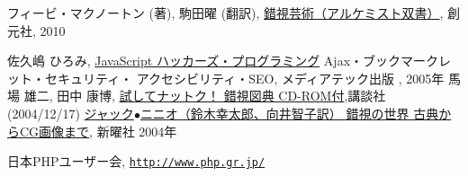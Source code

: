\begin{thebibliography}{99}
 フィービ・マクノートン (著), 駒田曜 (翻訳),
				 \href{http://www.amazon.co.jp/%E9%8C%AF%E8%A6%96%E8%8A%B8%E8%A1%93%EF%BC%88%E3%82%A2%E3%83%AB%E3%82%B1%E3%83%9F%E3%82%B9%E3%83%88%E5%8F%8C%E6%9B%B8%EF%BC%89-%E3%83%95%E3%82%A3%E3%83%BC%E3%83%93%E3%83%BB%E3%83%9E%E3%82%AF%E3%83%8E%E3%83%BC%E3%83%88%E3%83%B3/dp/4422214802/ref=sr_1_42?s=books&ie=UTF8&qid=1457336858&sr=1-42&keywords=%E9%8C%AF%E8%A6%96}{錯視芸術（アルケミスト双書）},
				 創元社, 2010
\fi
\iffalse
 \bibitem{Ajax}深津 貴之、増井 雄一郎、川崎 有亮、台場 圭一、WINGSプロジェクト,\\
\href{http://www.amazon.co.jp/exec/obidos/ASIN/4774125792/qid=1149342810/sr=8-2/ref=sr_8_xs_ap_i2_xgl14/249-2928731-2660351}
{Ajax 実装のための基礎テクニック}、技術評論社、2006年
\fi
\ifSeminor
\else
 佐久嶋 ひろみ,
\href{http://www.amazon.co.jp/exec/obidos/search-handle-url/index=books-jp&field-keywords=javascript/ref=xs_ap_sai1_xgl14/249-2928731-2660351}{JavaScript
	ハッカーズ・プログラミング} Ajax・ブックマークレット・セキュリティ・
	アクセシビリティ・SEO, メディアテック出版 , 2005年
         \fi
馬場 雄二, 田中 康博,
\href{http://www.amazon.co.jp/%E8%A9%A6%E3%81%97%E3%81%A6%E3%83%8A%E3%83%83%E3%83%88%E3%82%AF%EF%BC%81-%E9%8C%AF%E8%A6%96%E5%9B%B3%E5%85%B8-CD-ROM%E4%BB%98-%E9%A6%AC%E5%A0%B4-%E9%9B%84%E4%BA%8C/dp/4062744082/sr=1-1/qid=1167376185/ref=sr_1_1/503-0729601-8062303?ie=UTF8&s=books}
{試してナットク！ 錯視図典 CD-ROM付},講談社 (2004/12/17)
\href{http://www.amazon.co.jp/錯覚の世界—古典からCG画像まで-ジャック-ニニオ/dp/4788508885/ref=sr_1_2?ie=UTF8&s=books&qid=1206947415&sr=8-2}{ジャック$\bullet$ニニオ（鈴木幸太郎、向井智子訳）
錯視の世界 古典からCG画像まで}, 新曜社 2004年
\iffalse
 \bibitem{HTML5Guide}羽田野 太巳, 白石 俊平, 古籏 一浩 , 太田 昌吾,\\
	 \href{http://www.amazon.co.jp/Google-API-Expert%E3%81%8C%E8%A7%A3%E8%AA%AC%E3%81%99%E3%82%8BHTML5%E3%82%AC%E3%82%A4%E3%83%89%E3%83%96%E3%83%83%E3%82%AF-%E7%BE%BD%E7%94%B0%E9%87%8E-%E5%A4%AA%E5%B7%B3/dp/4844329278/ref=pd_sim_b_2}
{Google API Expertが解説するHTML5ガイドブック}, インプレスジャパン, 2010
\fi
\iffalse
 \bibitem{HTML5SmartPhone}クジラ飛行机 ,
 \href{http://www.amazon.co.jp/%E3%82%B9%E3%83%9E%E3%83%BC%E3%83%88%E3%83%95%E3%82%A9%E3%83%B3%E3%81%AE%E3%81%9F%E3%82%81%E3%81%AEHTML5%E3%82%A2%E3%83%97%E3%83%AA%E3%82%B1%E3%83%BC%E3%82%B7%E3%83%A7%E3%83%B3%E9%96%8B%E7%99%BA%E3%82%AC%E3%82%A4%E3%83%89%E2%80%95iPhone-iPad-Android%E5%AF%BE%E5%BF%9C-%E3%82%AF%E3%82%B8%E3%83%A9%E9%A3%9B%E8%A1%8C%E6%9C%BA/dp/4883377288/ref=pd_sim_b_5}
{スマートフォンのためのHTML5アプリケーション開発ガイド
				 iPhone/iPad/Android対応 }, ソシム, 2010
\fi
\ifSeminor\else
 日本PHPユーザー会,
				 \href{http://www.php.gr.jp/}{\texttt{http://www.php.gr.jp/}}
\fi
\iffalse
 \bibitem{AWK}A.V.エイホ , P.J.ワインバーガー , B.W.カーニハン ,
				 足立 高徳 (翻訳)
				プログラミング言語AWK, USP研究所, 2010
\fi
\end{thebibliography}

